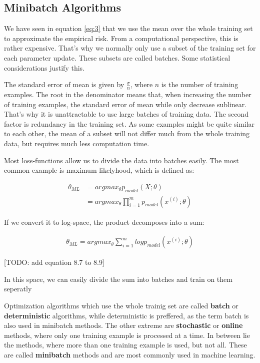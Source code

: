 \subsection{Minibatch Algorithms}\label{sub:3}
We have seen in equation \ref{eq:3} that we use the mean over the whole training
set to approximate the empirical risk. From a computational perspective, this is
rather expensive. That's why we normally only use a subset of the training set
for each parameter update. These subsets are called batches. Some statistical
considerations justify this.

The standard error of mean is given by $\frac{\sigma}{n}$, where $n$ is the
number of training examples. The root in the denominator means that, when
increasing the number of training examples, the standard error of mean while
only decrease sublinear. That's why it is unattractable to use large batches of
training data. The second factor is redundancy in the training set. As some
examples might be quite similar to each other, the mean of a subset will not
differ much from the whole training data, but requires much less computation
time.

Most loss-functions allow us to divide the data into batches easily. The most
common example is maximum likelyhood, which is defined as:

\begin{align}
    \theta_{ML}
    & = argmax_{\theta} p_{model}(X; \theta) \\
    & = argmax_{\theta} \prod_{i=1}^m p_{model}(x^{(i)}; \theta)
\end{align}

If we convert it to log-space, the product decomposes into a sum:

\begin{align}
    \theta_{ML} = argmax_{\theta} \sum_{i=1}^m log p_{model}(x^{(i)}; \theta)
\end{align}

[TODO: add equation 8.7 to 8.9]

In this space, we can easily divide the sum into batches and train on them seperatly

Optimization algorithms which use the whole trainig set are called
\textbf{batch} or \textbf{deterministic} algorithms, while deterministic is
preffered, as the term batch is also used in minibatch methods. The other
extreme are \textbf{stochastic} or \textbf{online} methods, where only one
training example is processed at a time. In between lie the methods, where more
than one training example is used, but not all. These are called \textbf{minibatch}
methods and are most commonly used in machine learning.

